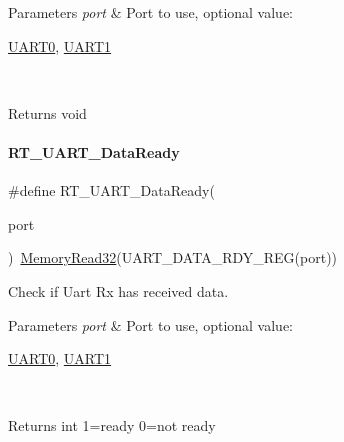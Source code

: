\begin{DoxyParams}{Parameters}
{\em port} & Port to use, optional value\+:
\begin{DoxyCode}
\mbox{\hyperlink{a00173_a0508661f121639ffdee7de2353a0def2}{UART0}}, \mbox{\hyperlink{a00173_a8d69bf04d07af4fbbab5a8bd291f65ff}{UART1}}
\end{DoxyCode}
 \\
\hline
\end{DoxyParams}
\begin{DoxyReturn}{Returns}
void 
\end{DoxyReturn}
\mbox{\label{a00173_abd2a573ae35e4f6381f9f9758a12806b}} 
\paragraph{\texorpdfstring{R\+T\+\_\+\+U\+A\+R\+T\+\_\+\+Data\+Ready}{RT\_UART\_DataReady}}
{\footnotesize\ttfamily \#define R\+T\+\_\+\+U\+A\+R\+T\+\_\+\+Data\+Ready(\begin{DoxyParamCaption}\item[{}]{port }\end{DoxyParamCaption})~\mbox{\hyperlink{a00068_a2d484dc15bdf30ee11ab3b05f31f0e16}{Memory\+Read32}}(U\+A\+R\+T\+\_\+\+D\+A\+T\+A\+\_\+\+R\+D\+Y\+\_\+\+R\+EG(port))}



Check if Uart Rx has received data. 


\begin{DoxyParams}{Parameters}
{\em port} & Port to use, optional value\+:
\begin{DoxyCode}
\mbox{\hyperlink{a00173_a0508661f121639ffdee7de2353a0def2}{UART0}}, \mbox{\hyperlink{a00173_a8d69bf04d07af4fbbab5a8bd291f65ff}{UART1}}
\end{DoxyCode}
 \\
\hline
\end{DoxyParams}
\begin{DoxyReturn}{Returns}
int 1=ready 0=not ready 
\end{DoxyReturn}
\mbox{\label{a00173_a74f1bca1f0b60eeec1f84bcba3e34919}} 
